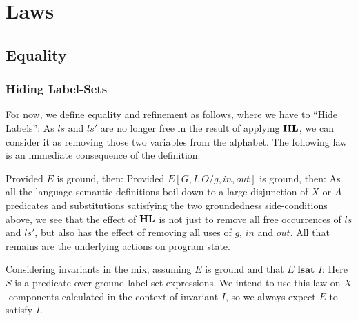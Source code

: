 \section{Laws}\label{sec:laws}

\subsection{Equality}\label{ssec:equality}

\subsubsection{Hiding Label-Sets}\label{sssec:HL}

For now, we define equality and refinement as follows,
where we have to ``Hide Labels'':
As $ls$ and $ls'$ are no longer free in the result of applying $\mathbf{HL}$,
we can consider it as removing those two variables from the alphabet.
The following law is an immediate consequence of the definition:

Provided $E$ is ground, then:
Provided $E[G,I,O/g,in,out]$ is ground, then:
As all the language semantic definitions boil down to a large
disjunction of $X$ or $A$ predicates and substitutions satisfying
the two groundedness side-conditions above,
we see that the effect of $\mathbf{HL}$ is not just to remove
all free occurrences of $ls$ and $ls'$,
but also has the effect of removing all uses of $g$, $in$ and $out$.
All that remains are the underlying actions on program state.

Considering invariants in the mix, assuming $E$ is ground
and that $E \textbf{ lsat } I$:
Here $S$ is a predicate over ground label-set expressions.
We intend to use this law on $X$-components calculated in the
context of invariant $I$, so we always expect $E$ to satisfy $I$.

